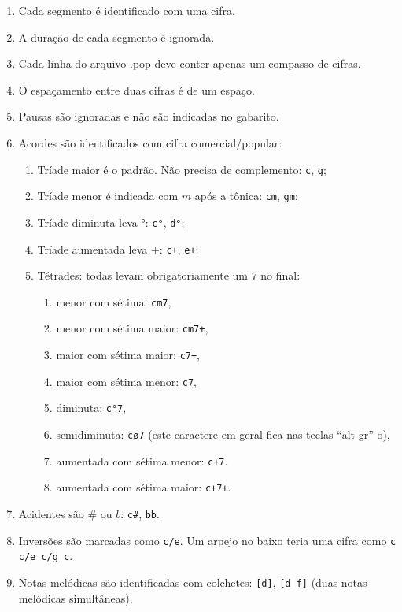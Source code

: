 \documentclass[12pt,brazil]{book}
\begin{document}
\begin{enumerate}
\item Cada segmento é identificado com uma cifra.
\item A duração de cada segmento é ignorada.
\item Cada linha do arquivo .pop deve conter apenas um compasso de
  cifras.
\item O espaçamento entre duas cifras é de um espaço.
\item Pausas são ignoradas e não são indicadas no gabarito.
\item Acordes são identificados com cifra comercial/popular:
  \begin{enumerate}
  \item Tríade maior é o padrão. Não precisa de complemento:
    \texttt{c}, \texttt{g};
  \item Tríade menor é indicada com $m$ após a tônica: \texttt{cm},
    \texttt{gm};
  \item Tríade diminuta leva $°$: \texttt{c°}, \texttt{d°};
  \item Tríade aumentada leva $+$: \texttt{c+}, \texttt{e+};
  \item Tétrades: todas levam obrigatoriamente um 7 no final:
    \begin{enumerate}
    \item menor com sétima: \texttt{cm7},
    \item menor com sétima maior: \texttt{cm7+},
    \item maior com sétima maior: \texttt{c7+},
    \item maior com sétima menor: \texttt{c7},
    \item diminuta: \texttt{c°7},
    \item semidiminuta: \texttt{cø7} (este caractere em geral fica nas
      teclas ``alt gr'' o),
    \item aumentada com sétima menor: \texttt{c+7}.
    \item aumentada com sétima maior: \texttt{c+7+}.
    \end{enumerate}
  \end{enumerate}
  \item Acidentes são $\#$ ou $b$: \texttt{c\#}, \texttt{bb}.
  \item Inversões são marcadas como \texttt{c/e}. Um arpejo no baixo
    teria uma cifra como \texttt{c c/e c/g c}.
\item Notas melódicas são identificadas com colchetes: \texttt{[d]},
  \texttt{[d f]} (duas notas melódicas simultâneas).

\end{enumerate}
\end{document}
